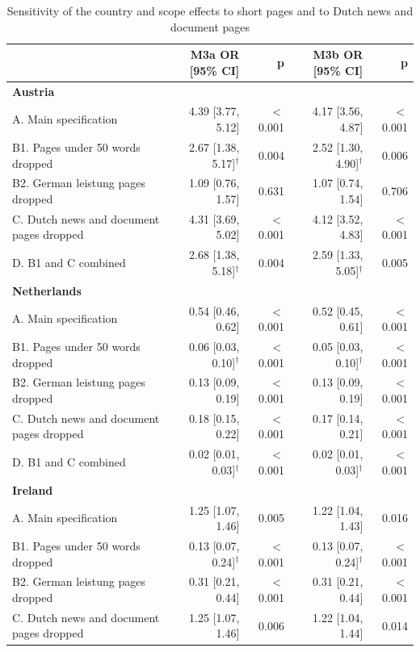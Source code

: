 \begin{table}[htbp]
\centering
\small
\begin{threeparttable}
\caption{Sensitivity of the country and scope effects to short pages and to Dutch news and document pages}
\label{tab:sens-country-ors}
\begin{tabular}{lrrrr}
\hline
 & M3a OR [95\% CI] & p & M3b OR [95\% CI] & p \\
\hline
\textbf{Austria} &  &  &  &  \\
\quad A. Main specification & 4.39 [3.77, 5.12] & $<$0.001 & 4.17 [3.56, 4.87] & $<$0.001 \\
\quad B1. Pages under 50 words dropped & 2.67 [1.38, 5.17]$^\dagger$ & 0.004 & 2.52 [1.30, 4.90]$^\dagger$ & 0.006 \\
\quad B2. German leistung pages dropped & 1.09 [0.76, 1.57] & 0.631 & 1.07 [0.74, 1.54] & 0.706 \\
\quad C. Dutch news and document pages dropped & 4.31 [3.69, 5.02] & $<$0.001 & 4.12 [3.52, 4.83] & $<$0.001 \\
\quad D. B1 and C combined & 2.68 [1.38, 5.18]$^\dagger$ & 0.004 & 2.59 [1.33, 5.05]$^\dagger$ & 0.005 \\
\hline
\textbf{Netherlands} &  &  &  &  \\
\quad A. Main specification & 0.54 [0.46, 0.62] & $<$0.001 & 0.52 [0.45, 0.61] & $<$0.001 \\
\quad B1. Pages under 50 words dropped & 0.06 [0.03, 0.10]$^\dagger$ & $<$0.001 & 0.05 [0.03, 0.10]$^\dagger$ & $<$0.001 \\
\quad B2. German leistung pages dropped & 0.13 [0.09, 0.19] & $<$0.001 & 0.13 [0.09, 0.19] & $<$0.001 \\
\quad C. Dutch news and document pages dropped & 0.18 [0.15, 0.22] & $<$0.001 & 0.17 [0.14, 0.21] & $<$0.001 \\
\quad D. B1 and C combined & 0.02 [0.01, 0.03]$^\dagger$ & $<$0.001 & 0.02 [0.01, 0.03]$^\dagger$ & $<$0.001 \\
\hline
\textbf{Ireland} &  &  &  &  \\
\quad A. Main specification & 1.25 [1.07, 1.46] & 0.005 & 1.22 [1.04, 1.43] & 0.016 \\
\quad B1. Pages under 50 words dropped & 0.13 [0.07, 0.24]$^\dagger$ & $<$0.001 & 0.13 [0.07, 0.24]$^\dagger$ & $<$0.001 \\
\quad B2. German leistung pages dropped & 0.31 [0.21, 0.44] & $<$0.001 & 0.31 [0.21, 0.44] & $<$0.001 \\
\quad C. Dutch news and document pages dropped & 1.25 [1.07, 1.46] & 0.006 & 1.22 [1.04, 1.44] & 0.014 \\

\end{tabular}
\end{threeparttable}
\end{table}
